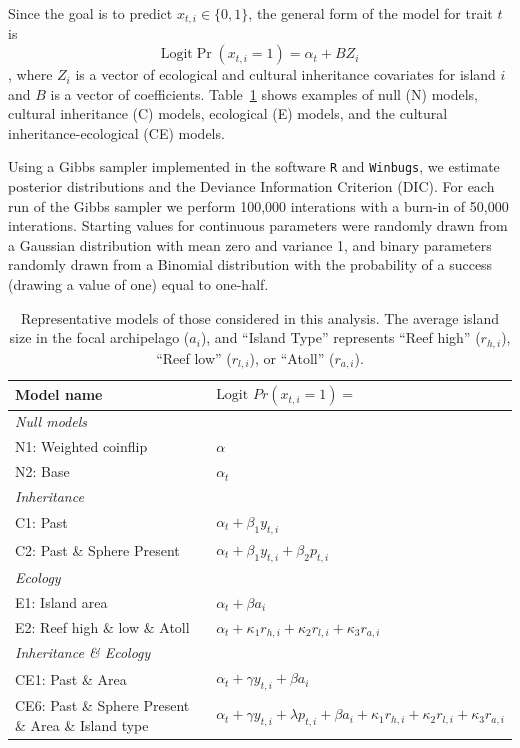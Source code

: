 Since the goal is to predict $x_{t,i} \in \{0,1\}$, the general form of the model for trait $t$ is
    \[\mathrm{Logit} \Pr( x_{t,i}=1 ) = \alpha_t + B Z_i \],
where $Z_i$ is a vector of ecological and cultural inheritance covariates for island $i$ and $B$ is a vector of coefficients. Table~\ref{modeltable} shows examples of null (N) models, cultural inheritance (C) models, ecological (E)  models, and the cultural inheritance-ecological (CE) models.

Using a Gibbs sampler implemented in the software \texttt{R} and \texttt{Winbugs}, we estimate posterior distributions and the Deviance Information Criterion (DIC). For each run of the Gibbs sampler we perform 100,000 interations with a burn-in of 50,000 interations. Starting values for continuous parameters were randomly drawn from a Gaussian distribution with mean zero and variance 1, and binary parameters randomly drawn from a Binomial distribution with the probability of a success (drawing a value of one) equal to one-half.

    \begin{table}[t]
    \begin{center}
    \begin{footnotesize}
    \begin{tabular}{p{7.5cm} p{7cm}}
    \bf{Model name} & $ \text{Logit }Pr(x_{t,i}=1) =$\\
    \hline
    {\em Null models}& \\
    \hline
    N1: Weighted coinflip & $ \alpha $ \\
    N2: Base & $ \alpha_t $ \\
    \hline
    {\em Inheritance} & \\
    \hline
    C1: Past & $\alpha_t + \beta_1 y_{t,i}$ \\
    C2: Past \& Sphere Present & $\alpha_t + \beta_1 y_{t,i} + \beta_2 p_{t,i} $ \\
    \hline
    {\em Ecology} & \\
    \hline
    E1: Island area &  $\alpha_t + \beta a_i$ \\
    E2: Reef high \& low \& Atoll & $\alpha_t + \kappa_1 r_{h,i} + \kappa_2 r_{l,i} + \kappa_3 r_{a,i}$ \\
    \hline
    {\em Inheritance \& Ecology} & \\
    \hline
    CE1: Past \& Area & $\alpha_t + \gamma y_{t,i} + \beta a_i$ \\
    CE6: Past \& Sphere Present \& Area \& Island type & $\alpha_t + \gamma y_{t,i} + \lambda p_{t,i} + \beta a_i + \kappa_1 r_{h,i} + \kappa_2 r_{l,i} + \kappa_3 r_{a,i}$ \\
    \hline
    \end{tabular}
    \end{footnotesize}
    \end{center}
    \label{models}
    \caption{Representative models of those considered in this analysis. The average island size in the focal archipelago ($a_i$), and ``Island Type'' represents ``Reef high'' ($r_{h,i}$), ``Reef low'' ($r_{l,i}$), or ``Atoll'' ($r_{a,i}$). \label{modeltable}}
    \end{table}

